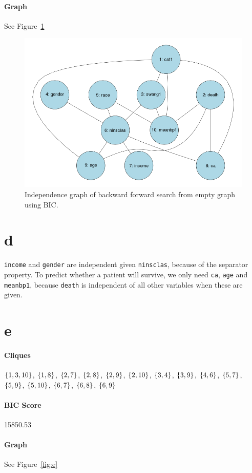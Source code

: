 \documentclass[12pt]{article}
\theoremstyle{definition}
\begin{document}
\paragraph{Graph} See Figure~\ref{fig:c}

\begin{figure}[H]
    \centering
    \includegraphics[width=0.8\linewidth]{c.png}
    \caption{Independence graph of backward forward search from empty graph using BIC.}
\label{fig:c}
\end{figure}

\section*{d}
\texttt{income} and \texttt{gender} are independent given \texttt{ninsclas}, because of the separator property.
To predict whether a patient will survive, we only need \texttt{ca}, \texttt{age} and \texttt{meanbp1}, because
\texttt{death} is independent of all other variables when these are given.

\section*{e}
\paragraph{Cliques}
$\set{1,3,10}$, $\set{1,8}$, $\set{2,7}$, $\set{2,8}$, $\set{2,9}$, $\set{2,10}$,
$\set{3,4}$, $\set{3,9}$, $\set{4,6}$, $\set{5,7}$, $\set{5,9}$, $\set{5,10}$,
$\set{6,7}$, $\set{6,8}$, $\set{6,9}$

\paragraph{BIC Score} 15850.53

\paragraph{Graph} See Figure~\ref{fig:e}
\end{document}
